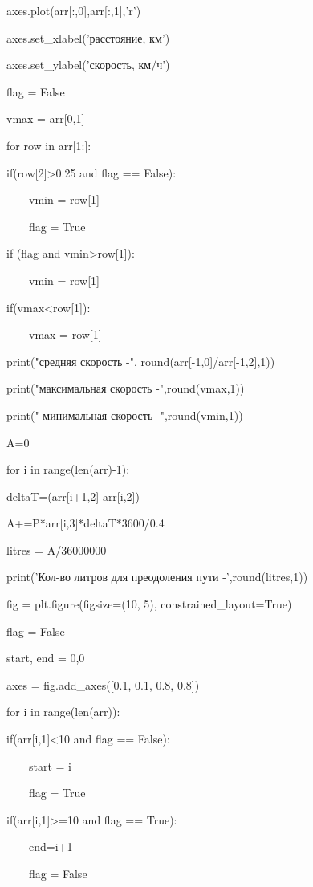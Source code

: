 \documentclass[A4paper,12pt]{article}
\theoremstyle{plain} %
\theoremstyle{definition} %
\theoremstyle{remark} %
\begin{document}
\noindent axes.plot(arr[:,0],arr[:,1],'r')

\noindent axes.set\_xlabel('расстояние, км')

\noindent axes.set\_ylabel('скорость, км/ч')

\noindent flag = False

\noindent vmax = arr[0,1]

\noindent for row in arr[1:]:

    if(row[2]>0.25 and flag == False):
    
    \ \ \ \ vmin = row[1]
        
    \ \ \ \ flag = True
        
    if (flag and vmin>row[1]):
    
    \ \ \ \ vmin = row[1]
        
    if(vmax<row[1]):
    
    \ \ \ \ vmax = row[1]
        
\noindent print("средняя скорость -", round(arr[-1,0]/arr[-1,2],1))

\noindent print("максимальная скорость -",round(vmax,1))

\noindent print(" минимальная скорость -",round(vmin,1))

\noindent A=0

\noindent for i in range(len(arr)-1):

    deltaT=(arr[i+1,2]-arr[i,2])
    
    A+=P*arr[i,3]*deltaT*3600/0.4
    
\noindent litres = A/36000000

\noindent print('Кол-во литров для преодоления пути -',round(litres,1))

\noindent fig = plt.figure(figsize=(10, 5), constrained\_layout=True)

\noindent flag = False

\noindent start, end = 0,0

\noindent axes = fig.add\_axes([0.1, 0.1, 0.8, 0.8])

\noindent for i in range(len(arr)):

    if(arr[i,1]<10 and flag == False):
    
    \ \ \ \ start = i
        
    \ \ \ \ flag = True
        
    if(arr[i,1]>=10 and flag == True):
    
    \ \ \ \ end=i+1
        
    \ \ \ \ flag = False
        
\end{document}
